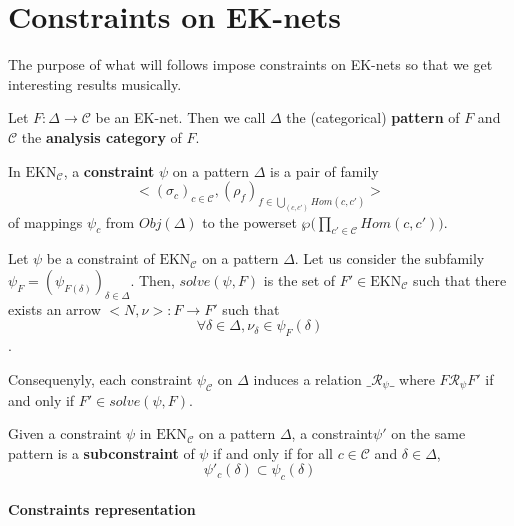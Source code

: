 

\section{Constraints on EK-nets}



The purpose of what will follows impose constraints on EK-nets so that we get interesting results musically.

Let $F : \Delta \rightarrow \mathcal{C}$ be an EK-net. Then we call $\Delta$ the (categorical) \textbf{pattern} of $F$ and $\mathcal{C}$ the \textbf{analysis category} of $F$.

\begin{defn}[Constraint]
    In $\text{EKN}_\mathcal{C}$, a \textbf{constraint} $\psi$ on a pattern $\Delta$ is a pair of family 
    $$\big<(\sigma_c)_{c\in\mathcal{C}},(\rho_f)_{f\in\bigcup_{(c,c')}Hom(c,c')}\big>$$
     of mappings $\psi_c$ from $Obj(\Delta)$
    to the powerset $\wp\big(\prod_{c'\in\mathcal{C}}Hom(c,c')\big)$.
\end{defn}


\begin{defn}
    Let $\psi$ be a constraint of $\text{EKN}_\mathcal{C}$ on a pattern $\Delta$.
    Let us consider the subfamily $\psi_F = (\psi_{F(\delta)})_{\delta\in\Delta}$. Then, $solve(\psi,F)$ is the set of $F' \in \text{EKN}_\mathcal{C}$ such that there exists an arrow $\big< N, \nu\big> : F \rightarrow F'$ such that
    $$\forall \delta \in \Delta, \nu_\delta \in \psi_F(\delta)$$.
\end{defn}

Consequenyly, each constraint $\psi_\mathcal{C}$ on $\Delta$ induces a relation
$\_\mathcal{R}_\psi \_$ where $F\mathcal{R}_\psi F'$ if and only if $F'\in solve(\psi,F)$.


\begin{defn}[Subconstraint]
    Given a constraint $\psi$ in $\text{EKN}_\mathcal{C}$ on a pattern $\Delta$, a constraint$\psi'$ on the same pattern is a \textbf{subconstraint} of $\psi$ if and only if for all $c\in \mathcal{C}$ and $\delta\in\Delta$,
    $$\psi'_c(\delta)\subset\psi_c(\delta)$$
\end{defn}

\paragraph{Constraints representation}

